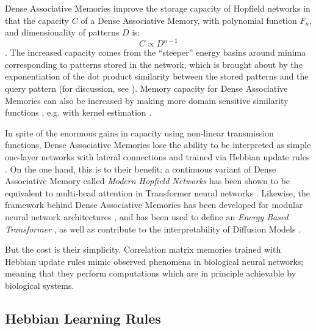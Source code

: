 \documentclass{article}
\theoremstyle{definition}
\begin{document}
Dense Associative Memories improve the storage capacity of Hopfield networks
in that the capacity $C$ of a Dense Associative Memory, with
polynomial function $F_n$,
and dimensionality of patterns $D$ is:
\begin{equation}
  C \propto D^{n-1}
\end{equation}
\parencites{krotov_dense_2016,demircigil_model_2017,bao_capacity_2022}.
The increased capacity comes from the ``steeper'' energy basins
around minima corresponding to patterns stored in the network, which
is brought about by the exponentiation of the dot product similarity
between the stored patterns and the query pattern (for discussion, see
\textcite{kelly_memory_2017}). Memory capacity for Dense Associative
Memories can also be increased by making more domain sensitive
similarity functions \parencite{millidge_universal_2022},
e.g. with kernel estimation \parencite{hu_provably_2024,wu_uniform_2024}.

In spite of the enormous gains in capacity using non-linear
transmission functions, Dense Associative Memories lose the ability
to be interpreted as simple one-layer networks with lateral connections
and trained via Hebbian update rules
\parencites{krotov_large_2021,mcalister_sequential_2025}.
On the one hand, this is to their benefit: a continuous variant of
Dense Associative
Memory called \textit{Modern Hopfield Networks} has been shown to be
equivalent to multi-head attention in Transformer neural networks
\parencites{ramsauer_hopfield_2021,vaswani_attention_2023}. Likewise,
the framework behind Dense Associative Memories has been developed for
modular neural network architectures \parencite{krotov_hierarchical_2021},
and has been used to define an \textit{Energy Based Transformer}
\parencite{hoover_energy_2023}, as well as contribute to the interpretability
of Diffusion Models \parencite{pham_memorization_2025}.

But the cost is their simplicity. Correlation matrix memories
trained with Hebbian update rules mimic observed phenomena in
biological neural networks; meaning that they perform computations
which are in principle achievable by biological systems.

\subsection{Hebbian Learning Rules}\label{sec:hebbian-learning-rules}
\end{document}
